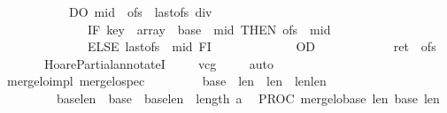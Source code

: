 \begin{isabellebody}
\ \ \ \ \ \ \ \ \ \ \ \ DO\ {\isasymacute}mid\ {\isacharcolon}{\isacharequal}{\isacharequal}\ {\isacharparenleft}{\isasymacute}ofs\ {\isacharplus}\ {\isasymacute}last{\isacharunderscore}ofs{\isacharparenright}\ div\ {}{\isacharsemicolon}{\isacharsemicolon}\isanewline
\ \ \ \ \ \ \ \ \ \ \ \ \ \ \ IF\ {\isasymacute}key\ {\isacharless}\ {\isasymacute}array\ {\isacharbang}\ {\isacharparenleft}{\isasymacute}base\ {\isacharplus}\ {\isasymacute}mid{\isacharparenright}\ THEN\ {\isasymacute}ofs\ {\isacharcolon}{\isacharequal}{\isacharequal}\ {\isasymacute}mid\isanewline
\ \ \ \ \ \ \ \ \ \ \ \ \ \ \ ELSE\ {\isasymacute}last{\isacharunderscore}ofs\ {\isacharcolon}{\isacharequal}{\isacharequal}\ {\isasymacute}mid{\isacharplus}{}\ FI\ \isanewline
\ \ \ \ \ \ \ \ \ \ \ \ OD{\isacharsemicolon}{\isacharsemicolon}\isanewline
\ \ \ \ \ \ \ \ \ \ \ \ {\isasymacute}ret\ {\isacharcolon}{\isacharequal}{\isacharequal}\ {\isasymacute}ofs\isanewline
\ \ \ \ \ \ {\isachardoublequoteclose}\ \ HoarePartial{\isachardot}annotateI{\isacharparenright}\isanewline
\ \ \ \isamarkupfalse%
\ vcg\isanewline
\ \ \ \isamarkupfalse%
\ auto%
\endisatagproof
{\isafoldproof}%
%
\isadelimproof
\ \ \isanewline
%
\endisadelimproof
\isanewline
\isanewline
\isanewline
\ \isamarkupfalse%
\ {\isacharparenleft}\ merge{\isacharunderscore}lo{\isacharunderscore}impl{\isacharparenright}\ merge{\isacharunderscore}lo{\isacharunderscore}spec{\isacharcolon}\isanewline
\ \ \isanewline
\ \ {\isachardoublequoteopen}{\isasymforall}{\isasymsigma}{\isachardot}\ {\isasymGamma}{\isasymturnstile}\ {\isasymlbrace}\ {\isasymsigma}{\isachardot}\ {\isasymacute}base{}{\isasymge}{}\ {\isasymand}\ {\isasymacute}len{}{\isachargreater}{}\ {\isasymand}\ {\isasymacute}len{}{\isachargreater}{}\ {\isasymand}\ {\isasymacute}len{}{\isasymle}{\isasymacute}len{}\ {\isasymand}\ \isanewline
\ \ \ \ \ \ \ \ \ \ {\isacharparenleft}{\isasymacute}base{}{\isacharplus}{\isasymacute}len{}\ {\isacharequal}\ {\isasymacute}base{}{\isacharparenright}\ {\isasymand}\ {\isacharparenleft}{\isasymacute}base{}{\isacharplus}{\isasymacute}len{}\ {\isasymle}\ length\ {\isasymacute}a{\isacharparenright}{\isasymrbrace}\isanewline
\ \ PROC\ merge{\isacharunderscore}lo{\isacharparenleft}{\isasymacute}base{}{\isacharcomma}\ {\isasymacute}len{}{\isacharcomma}\ {\isasymacute}base{}{\isacharcomma}\ {\isasymacute}len{}{\isacharparenright}\isanewline

\end{isabellebody}
